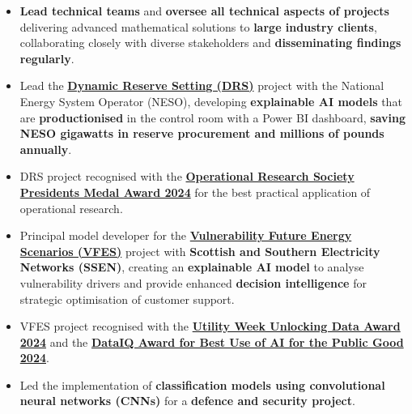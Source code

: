 \documentclass{my_cv}
\begin{document}
%
    {\begin{itemize}[topsep=0pt,itemsep=0pt,partopsep=0pt, parsep=0pt] 
\item \textbf{Lead technical teams} and \textbf{oversee all technical aspects of projects} delivering advanced mathematical solutions to \textbf{large industry clients}, collaborating closely with diverse stakeholders and \textbf{disseminating findings regularly}.
  \item Lead the \textbf{\href{https://www.neso.energy/news/dynamic-reserve-setting-innovation-project-seeks-reduce-balancing-costs}{Dynamic Reserve Setting (DRS)}} project with the National Energy System Operator (NESO), developing \textbf{explainable AI models} that are \textbf{productionised} in the control room with a Power BI dashboard, \textbf{saving NESO gigawatts in reserve procurement and millions of pounds annually}.
  \item DRS project recognised with the \textbf{\href{https://www.theorsociety.com/ORS/ORS/About-OR/News/Presidents-Medal-award.aspx}{Operational Research Society Presidents Medal Award 2024}} for the best practical application of operational research.
\item Principal model developer for the \textbf{\href{https://ssen-innovation.co.uk/nia-projects/vfes/}{Vulnerability Future Energy Scenarios (VFES)}} project with \textbf{Scottish and Southern Electricity Networks (SSEN)}, creating an \textbf{explainable AI model} to analyse vulnerability drivers and provide enhanced \textbf{decision intelligence} for strategic optimisation of customer support.
  \item VFES project recognised with the \textbf{\href{https://www.ssen.co.uk/news-views/2024/SSENs-innovative-net-zero-programmes-win-big-at-the-2024-Utility-Week-awards/}{Utility Week Unlocking Data Award 2024}} and the \textbf{\href{https://www.dataiq.global/award-winner/2024-dataiq-awards-best-use-of-ai-for-the-public-good/}{DataIQ Award for Best Use of AI for the Public Good 2024}}.
  \item Led the implementation of \textbf{classification models using convolutional neural networks (CNNs)} for a \textbf{defence and security project}.
    \end{itemize}
    }%
\end{document}
